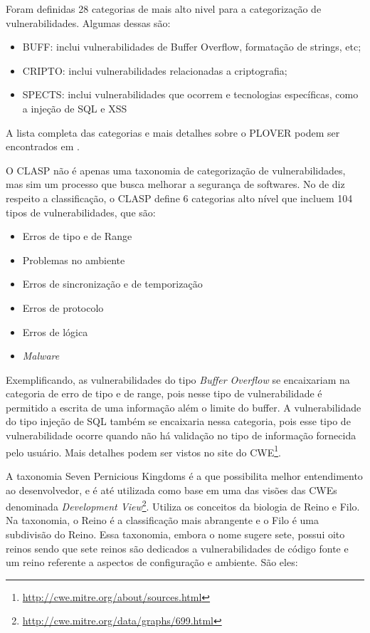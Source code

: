 %

Foram definidas 28 categorias de mais alto nivel para a categorização de vulnerabilidades. Algumas dessas são:

\begin{itemize}
\item BUFF: inclui vulnerabilidades de Buffer Overflow, formatação de strings, etc;
\item CRIPTO: inclui vulnerabilidades relacionadas a criptografia;
\item SPECTS: inclui vulnerabilidades que ocorrem e tecnologias específicas, como a injeção de SQL e XSS
\end{itemize}

A lista completa das categorias e mais detalhes sobre o PLOVER podem ser encontrados em \cite{christey2006}.

%

O CLASP não é apenas uma taxonomia de categorização de vulnerabilidades, mas sim um processo que busca melhorar a segurança de softwares. No de diz respeito a classificação, o CLASP define 6 categorias alto nível que incluem 104 tipos de vulnerabilidades, que são:

\begin{itemize}
\item Erros de tipo e de Range
\item Problemas no ambiente 
\item Erros de sincronização e de temporização
\item Erros de protocolo
\item Erros de lógica
\item \emph{Malware}
\end{itemize}

%
Exemplificando, as vulnerabilidades do tipo \emph{Buffer Overflow} se encaixariam na categoria de erro de tipo e de range, pois nesse tipo de vulnerabilidade é permitido a escrita de uma informação além o limite do buffer. A vulnerabilidade do tipo  injeção de SQL também se encaixaria nessa categoria, pois esse tipo de vulnerabilidade ocorre quando não há validação no tipo de informação fornecida pelo usuário. Mais detalhes podem ser vistos no site do CWE\footnote{\url{http://cwe.mitre.org/about/sources.html}}.

%

A taxonomia Seven Pernicious Kingdoms é a que possibilita melhor entendimento ao desenvolvedor, e é até utilizada como base em uma das visões das CWEs denominada \emph{Development View}\footnote{\url{http://cwe.mitre.org/data/graphs/699.html}}. Utiliza os conceitos da biologia de Reino e Filo. Na taxonomia, o Reino é a classificação mais abrangente e o Filo é uma subdivisão do Reino. Essa taxonomia, embora o nome sugere sete, possui oito reinos sendo que sete reinos são dedicados a vulnerabilidades de código fonte e um reino referente a aspectos de configuração e ambiente. São eles:

